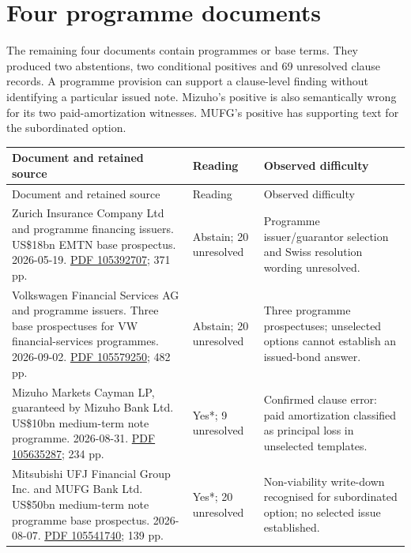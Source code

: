 \section{Four programme documents}

The remaining four documents contain programmes or base terms. They produced
two abstentions, two conditional positives and 69 unresolved clause records.
A programme provision can support a clause-level finding without identifying
a particular issued note. Mizuho's positive is also semantically wrong for
its two paid-amortization witnesses. MUFG's positive has supporting text for
the subordinated option.

{\small
\begin{longtable}{P{0.44\textwidth}P{0.12\textwidth}P{0.34\textwidth}}
\toprule
Document and retained source & Reading & Observed difficulty \\
\midrule
\endfirsthead
\toprule
Document and retained source & Reading & Observed difficulty \\
\midrule
\endhead
Zurich Insurance Company Ltd and programme financing issuers. US\$18bn EMTN base prospectus. 2026-05-19. \href{../prospectus/difficulty-2026-10-04/pdfs/case-105392707.pdf}{PDF 105392707}; 371 pp. & Abstain; 20 unresolved & Programme issuer/guarantor selection and Swiss resolution wording unresolved. \\

Volkswagen Financial Services AG and programme issuers. Three base prospectuses for VW financial-services programmes. 2026-09-02. \href{../prospectus/difficulty-2026-10-04/pdfs/case-105579250.pdf}{PDF 105579250}; 482 pp. & Abstain; 20 unresolved & Three programme prospectuses; unselected options cannot establish an issued-bond answer. \\

Mizuho Markets Cayman LP, guaranteed by Mizuho Bank Ltd. US\$10bn medium-term note programme. 2026-08-31. \href{../prospectus/difficulty-2026-10-04/pdfs/case-105635287.pdf}{PDF 105635287}; 234 pp. & Yes*; 9 unresolved & Confirmed clause error: paid amortization classified as principal loss in unselected templates. \\

Mitsubishi UFJ Financial Group Inc. and MUFG Bank Ltd. US\$50bn medium-term note programme base prospectus. 2026-08-07. \href{../prospectus/difficulty-2026-10-04/pdfs/case-105541740.pdf}{PDF 105541740}; 139 pp. & Yes*; 20 unresolved & Non-viability write-down recognised for subordinated option; no selected issue established. \\
\bottomrule
\end{longtable}
}

